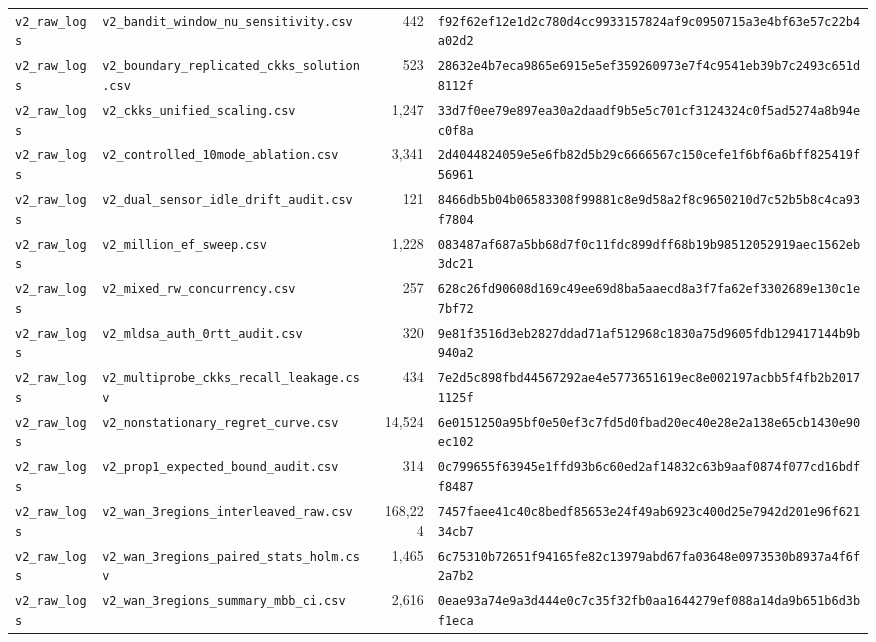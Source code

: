 \begin{table}[t]
{\begin{tabular}{@{}llrl@{}}
\texttt{v2\_raw\_logs} & \texttt{v2\_bandit\_window\_nu\_sensitivity.csv} & 442 & \texttt{f92f62ef12e1d2c780d4cc9933157824af9c0950715a3e4bf63e57c22b4a02d2} \\
\texttt{v2\_raw\_logs} & \texttt{v2\_boundary\_replicated\_ckks\_solution.csv} & 523 & \texttt{28632e4b7eca9865e6915e5ef359260973e7f4c9541eb39b7c2493c651d8112f} \\
\texttt{v2\_raw\_logs} & \texttt{v2\_ckks\_unified\_scaling.csv} & 1,247 & \texttt{33d7f0ee79e897ea30a2daadf9b5e5c701cf3124324c0f5ad5274a8b94ec0f8a} \\
\texttt{v2\_raw\_logs} & \texttt{v2\_controlled\_10mode\_ablation.csv} & 3,341 & \texttt{2d4044824059e5e6fb82d5b29c6666567c150cefe1f6bf6a6bff825419f56961} \\
\texttt{v2\_raw\_logs} & \texttt{v2\_dual\_sensor\_idle\_drift\_audit.csv} & 121 & \texttt{8466db5b04b06583308f99881c8e9d58a2f8c9650210d7c52b5b8c4ca93f7804} \\
\texttt{v2\_raw\_logs} & \texttt{v2\_million\_ef\_sweep.csv} & 1,228 & \texttt{083487af687a5bb68d7f0c11fdc899dff68b19b98512052919aec1562eb3dc21} \\
\texttt{v2\_raw\_logs} & \texttt{v2\_mixed\_rw\_concurrency.csv} & 257 & \texttt{628c26fd90608d169c49ee69d8ba5aaecd8a3f7fa62ef3302689e130c1e7bf72} \\
\texttt{v2\_raw\_logs} & \texttt{v2\_mldsa\_auth\_0rtt\_audit.csv} & 320 & \texttt{9e81f3516d3eb2827ddad71af512968c1830a75d9605fdb129417144b9b940a2} \\
\texttt{v2\_raw\_logs} & \texttt{v2\_multiprobe\_ckks\_recall\_leakage.csv} & 434 & \texttt{7e2d5c898fbd44567292ae4e5773651619ec8e002197acbb5f4fb2b20171125f} \\
\texttt{v2\_raw\_logs} & \texttt{v2\_nonstationary\_regret\_curve.csv} & 14,524 & \texttt{6e0151250a95bf0e50ef3c7fd5d0fbad20ec40e28e2a138e65cb1430e90ec102} \\
\texttt{v2\_raw\_logs} & \texttt{v2\_prop1\_expected\_bound\_audit.csv} & 314 & \texttt{0c799655f63945e1ffd93b6c60ed2af14832c63b9aaf0874f077cd16bdff8487} \\
\texttt{v2\_raw\_logs} & \texttt{v2\_wan\_3regions\_interleaved\_raw.csv} & 168,224 & \texttt{7457faee41c40c8bedf85653e24f49ab6923c400d25e7942d201e96f62134cb7} \\
\texttt{v2\_raw\_logs} & \texttt{v2\_wan\_3regions\_paired\_stats\_holm.csv} & 1,465 & \texttt{6c75310b72651f94165fe82c13979abd67fa03648e0973530b8937a4f6f2a7b2} \\
\texttt{v2\_raw\_logs} & \texttt{v2\_wan\_3regions\_summary\_mbb\_ci.csv} & 2,616 & \texttt{0eae93a74e9a3d444e0c7c35f32fb0aa1644279ef088a14da9b651b6d3bf1eca} \\

\end{tabular}}
\end{table}
